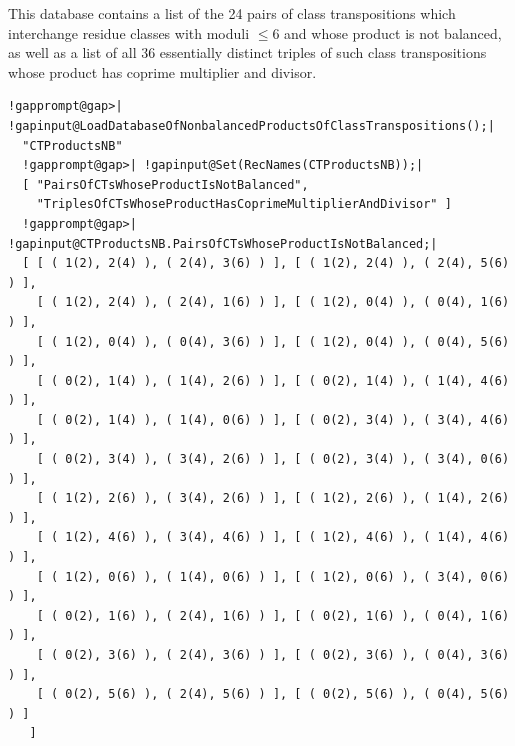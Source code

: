 \documentclass[a4paper,11pt]{report}
\begin{document}
{{{ This database contains a list of the 24 pairs of class transpositions which
interchange residue classes with moduli $\leq 6$ and whose product is not balanced, as well as a list of all 36 essentially
distinct triples of such class transpositions whose product has coprime
multiplier and divisor. 
\begin{Verbatim}[commandchars=!@|,fontsize=\small,frame=single,label=Example]
  !gapprompt@gap>| !gapinput@LoadDatabaseOfNonbalancedProductsOfClassTranspositions();|
  "CTProductsNB"
  !gapprompt@gap>| !gapinput@Set(RecNames(CTProductsNB));|
  [ "PairsOfCTsWhoseProductIsNotBalanced", 
    "TriplesOfCTsWhoseProductHasCoprimeMultiplierAndDivisor" ]
  !gapprompt@gap>| !gapinput@CTProductsNB.PairsOfCTsWhoseProductIsNotBalanced;|
  [ [ ( 1(2), 2(4) ), ( 2(4), 3(6) ) ], [ ( 1(2), 2(4) ), ( 2(4), 5(6) ) ], 
    [ ( 1(2), 2(4) ), ( 2(4), 1(6) ) ], [ ( 1(2), 0(4) ), ( 0(4), 1(6) ) ], 
    [ ( 1(2), 0(4) ), ( 0(4), 3(6) ) ], [ ( 1(2), 0(4) ), ( 0(4), 5(6) ) ], 
    [ ( 0(2), 1(4) ), ( 1(4), 2(6) ) ], [ ( 0(2), 1(4) ), ( 1(4), 4(6) ) ], 
    [ ( 0(2), 1(4) ), ( 1(4), 0(6) ) ], [ ( 0(2), 3(4) ), ( 3(4), 4(6) ) ], 
    [ ( 0(2), 3(4) ), ( 3(4), 2(6) ) ], [ ( 0(2), 3(4) ), ( 3(4), 0(6) ) ], 
    [ ( 1(2), 2(6) ), ( 3(4), 2(6) ) ], [ ( 1(2), 2(6) ), ( 1(4), 2(6) ) ], 
    [ ( 1(2), 4(6) ), ( 3(4), 4(6) ) ], [ ( 1(2), 4(6) ), ( 1(4), 4(6) ) ], 
    [ ( 1(2), 0(6) ), ( 1(4), 0(6) ) ], [ ( 1(2), 0(6) ), ( 3(4), 0(6) ) ], 
    [ ( 0(2), 1(6) ), ( 2(4), 1(6) ) ], [ ( 0(2), 1(6) ), ( 0(4), 1(6) ) ], 
    [ ( 0(2), 3(6) ), ( 2(4), 3(6) ) ], [ ( 0(2), 3(6) ), ( 0(4), 3(6) ) ], 
    [ ( 0(2), 5(6) ), ( 2(4), 5(6) ) ], [ ( 0(2), 5(6) ), ( 0(4), 5(6) ) ] 
   ]
\end{Verbatim}
 }

 }

  }

       
\end{document}
